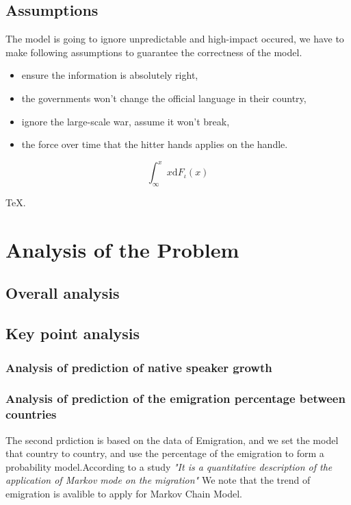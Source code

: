 \documentclass{mcmthesis}
\begin{document}
\subsection{Assumptions}
\qquad The model is going to ignore unpredictable and high-impact occured, we have to make following assumptions to guarantee the correctness of the model.
\begin{itemize}
\item ensure the information is absolutely right, 
\item the governments won't change the official language in their country,
\item ignore the large-scale war, assume it won't break,
\item the force over time that the hitter hands applies on the handle.
\end{itemize}


\begin{Theorem} \label{thm:latex}
\begin{equation}\int^x_\infty x \mathrm{d}F_\iota(x)
\end{equation}
\end{Theorem}
\begin{Lemma} \label{thm:tex}
\TeX .
\end{Lemma}
\section{Analysis of the Problem}
\subsection{Overall analysis}

\subsection{Key point analysis}
\subsubsection{Analysis of prediction of native speaker growth}

\subsubsection{Analysis of prediction of the emigration percentage between countries}
The second prdiction is based on the data of Emigration, and we set the model that country to country, and use the percentage of the emigration to 
form a probability model.According to a study\cite{tec} \emph{"It is a quantitative description of the application of Markov
mode on the migration"} We note that the trend of emigration is avalible to apply for Markov Chain Model. 
\end{document}
